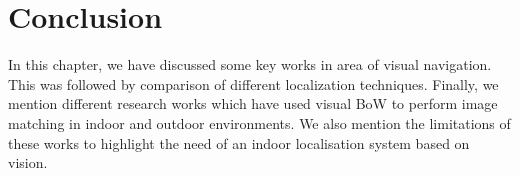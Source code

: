 \section{Conclusion}
\label{sec:conclusion}
In this chapter, we have discussed some key works in area of visual navigation. 
This was followed by comparison of different localization techniques.
Finally, we mention different research works which have used visual 
BoW to perform image matching in indoor and outdoor environments.
We also mention the limitations of these works to highlight the need 
of an indoor localisation system based on vision.

